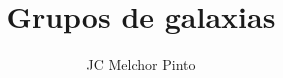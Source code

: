 \documentclass[12pt,addpoints,answers]{guia}
\title{Grupos de galaxias}
\author{JC Melchor Pinto}
\begin{document}
\INFO%
\begin{questions}
    \questionboxed[25]{}
    \questionboxed[25]{}
    \questionboxed[25]{}
\end{questions}
\end{document}
